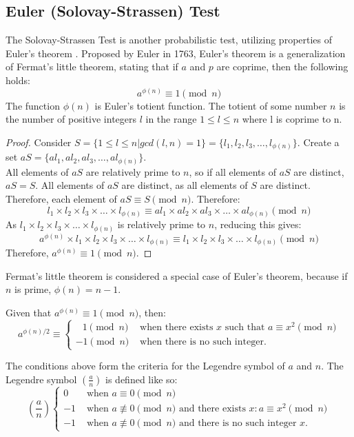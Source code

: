 \documentclass{article}
\begin{document}
\subsection{Euler (Solovay-Strassen) Test} %
The Solovay-Strassen Test is another probabilistic test, utilizing properties of Euler's theorem \cite{solovay_fast_1977}. Proposed by Euler in 1763, Euler's theorem is a generalization of Fermat's little theorem, stating that if $a$ and $p$ are coprime, then the following holds:
\[
    a^{\phi(n)} \equiv 1 \pmod{n}
\]
The function $\phi(n)$ is Euler's totient function. The totient of some number $n$ is the number of positive integers $l$ in the range $1 \leq l \leq n$ where l is coprime to n.

\begin{proof}
    Consider $S = \{1 \leq l \leq n | gcd(l, n) = 1\} = \{l_1, l_2, l_3, \ldots{}, l_{\phi(n)}\}$.
    Create a set $aS = \{al_1, al_2, al_3, \ldots{}, al_{\phi(n)}\}$. \\
    All elements of $aS$ are relatively prime to $n$, so if all elements of $aS$ are distinct, $aS = S$. All elements of $aS$ are distinct, as all elements of $S$ are distinct. Therefore, each element of $aS \equiv S \pmod{n}$.
    Therefore:
    \[
        l_1 \times l_2 \times l_3 \times \ldots{} \times l_{\phi(n)} \equiv al_1 \times al_2 \times al_3 \times \ldots{} \times al_{\phi(n)} \pmod{n}
    \]
    As $l_1 \times l_2 \times l_3 \times \ldots{} \times l_{\phi(n)}$ is relatively prime to $n$, reducing this gives:
    \[
        a^{\phi(n)} \times l_1 \times l_2 \times l_3 \times \ldots{} \times l_{\phi(n)} \equiv l_1 \times l_2 \times l_3 \times \ldots{} \times l_{\phi(n)} \pmod{n}
    \]
    Therefore, $a^{\phi(n)} \equiv 1 \pmod{n}$.
\end{proof}

Fermat's little theorem is considered a special case of Euler's theorem, because if $n$ is prime, $\phi(n) = n - 1$.

Given that $a^{\phi(n)} \equiv 1 \pmod{n}$, then:
\[
    a^{\phi(n) / 2} \equiv \begin{cases}
\;\;\,1\pmod{n}& \text{ when there exists }x \text{ such that }a\equiv x^2 \pmod{n}\\
     -1\pmod{n}& \text{ when there is no such integer.}
\end{cases}
\]

The conditions above form the criteria for the Legendre symbol of $a$ and $n$. The Legendre symbol $\left(\frac{a}{n}\right)$ is defined like so:
\[
    \left(\frac{a}{n}\right) \begin{cases}
        0 & \text{ when $a \equiv 0 \pmod{n}$} \\
        -1& \text{ when $a \not\equiv 0 \pmod{n}$ and there exists $x: a \equiv x^2 \pmod{n}$} \\
     -1& \text{ when $a \not\equiv 0 \pmod{n}$ and there is no such integer $x$.}
\end{cases}
\]
\end{document}
